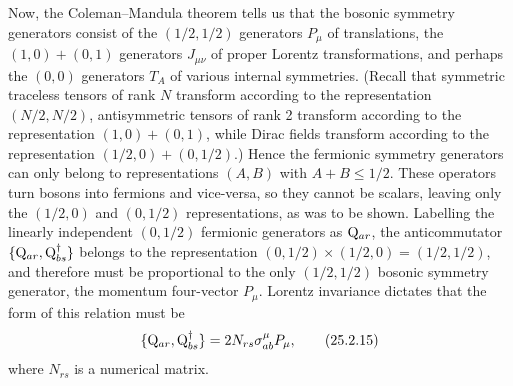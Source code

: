 Now, the Coleman--Mandula theorem tells us that the bosonic symmetry
generators consist of the \((1/2,1/2)\) generators \(P_\mu\) of
translations, the \((1,0)+(0,1)\) generators \(J_{\mu\nu}\) of proper
Lorentz transformations, and perhaps the \((0,0)\) generators \(T_A\) of
various internal symmetries. (Recall that symmetric traceless tensors of rank
\(N\) transform according to the representation \((N/2,N/2)\),
antisymmetric tensors of rank 2 transform according to the representation
\((1,0)+(0,1)\), while Dirac fields transform according to the
representation \((1/2,0)+(0,1/2)\).) Hence the fermionic symmetry generators
can only belong to representations \((A,B)\) with \(A+B\leq1/2\). These
operators turn bosons into fermions and vice-versa, so they cannot be
scalars, leaving only the \((1/2,0)\) and \((0,1/2)\) representations, as
was to be shown. Labelling the linearly independent \((0,1/2)\) fermionic
generators as \(\mathrm{Q}_{ar}\), the anticommutator
\(\{\mathrm{Q}_{ar},\mathrm{Q}_{bs}^\dagger\}\) belongs to the representation
\((0,1/2)\times(1/2,0)=(1/2,1/2)\), and therefore must be proportional to
the only \((1/2,1/2)\) bosonic symmetry generator, the momentum four-vector
\(P_\mu\). Lorentz invariance dictates that the form of this relation must
be
\begin{equation}
\{\mathrm{Q}_{ar},\mathrm{Q}_{bs}^\dagger\}
=2N_{rs}\sigma^\mu_{ab}P_\mu,
\tag{25.2.15}\label{eq:25.2.15}
\end{equation}
where \(N_{rs}\) is a numerical matrix.


